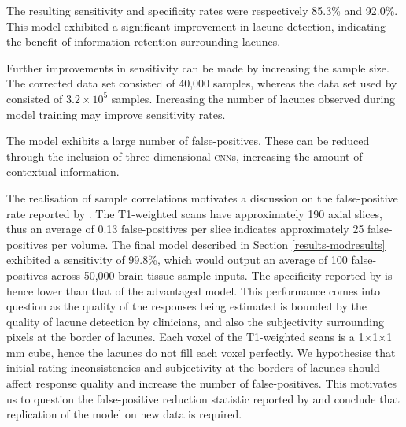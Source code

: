 The resulting sensitivity and specificity rates were respectively 85.3\% and 92.0\%. This model exhibited a significant improvement in lacune detection, indicating the benefit of information retention surrounding lacunes.

Further improvements in sensitivity can be made by increasing the sample size. The corrected data set consisted of 40,000 samples, whereas the data set used by \cite{GhafoorianM.2017Dml3} consisted of $3.2\times10^5$ samples. Increasing the number of lacunes observed during model training may improve sensitivity rates.

The model exhibits a large number of false-positives. These can be reduced through the inclusion of three-dimensional \textsc{cnn}s, increasing the amount of contextual information.

The realisation of sample correlations motivates a discussion on the false-positive rate reported by \cite{GhafoorianM.2017Dml3}. The T1-weighted scans have approximately 190 axial slices, thus an average of 0.13 false-positives per slice indicates approximately 25 false-positives per volume. The final model described in Section \ref{results-modresults} exhibited a sensitivity of 99.8\%, which would output an average of 100 false-positives across 50,000 brain tissue sample inputs. The specificity reported by \cite{GhafoorianM.2017Dml3} is hence lower than that of the advantaged model. This performance comes into question as the quality of the responses being estimated is bounded by the quality of lacune detection by clinicians, and also the subjectivity surrounding pixels at the border of lacunes. Each voxel of the T1-weighted scans is a 1$\times$1$\times$1 mm cube, hence the lacunes do not fill each voxel perfectly. We hypothesise that initial rating inconsistencies and subjectivity at the borders of lacunes should affect response quality and increase the number of false-positives. This motivates us to question the false-positive reduction statistic reported by \cite{GhafoorianM.2017Dml3} and conclude that replication of the model on new data is required.




%
%